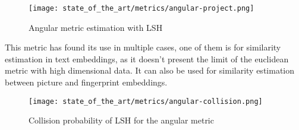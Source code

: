 \begin{figure}[h]
    \centering
    \texttt{[image: state\_of\_the\_art/metrics/angular-project.png]}
    \caption{Angular metric estimation with LSH}
    \label{fig:angular_illustration}
\end{figure}

This metric has found its use in multiple cases, one of them is for similarity
estimation in text embeddings, as it doesn't present the limit of the euclidean
metric with high dimensional data. It can also be used for similarity estimation
between picture and fingerprint embeddings.

\begin{figure}[h]
    \centering
    \texttt{[image: state\_of\_the\_art/metrics/angular-collision.png]}
    \caption{Collision probability of LSH for the angular metric}
    \label{fig:angular_collision_intuition}
\end{figure}
